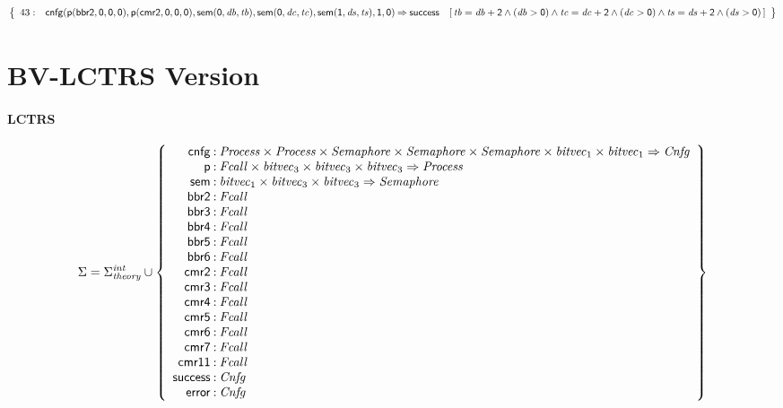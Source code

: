 \documentclass[a4paper]{article}
\newcommand{\Sort}[1]{\mathit{#1}}
\newcommand{\symb}[1]{\mathsf{#1}}
\newcommand{\var}[1]{\mathit{#1}}
\newcommand{\Constraint}[1]{[\, #1 \,]}
\newcommand{\Sigmainttheory}{\Sigma^{\mathit{int}}_{\mathit{theory}}}
\begin{document}
\begin{landscape}
\[
\left\{
\begin{array}{rr@{\>}c@{\>}ll}
\mathrm{43} : 
 & \symb{cnfg}(\symb{p}(\symb{bbr2},\symb{0},\symb{0},\symb{0}),\symb{p}(\symb{cmr2},\symb{0},\symb{0},\symb{0}),\symb{sem}(\symb{0},\var{db},\var{tb}),\symb{sem}(\symb{0},\var{dc},\var{tc}),\symb{sem}(\symb{1},\var{ds},\var{ts}),\symb{1},\symb{0})
 & \Rightarrow 
 & \symb{success}
 & \Constraint{\var{tb} = \var{db} + \symb{2} \land (\var{db} > \symb{0}) \land \var{tc} = \var{dc} + \symb{2} \land (\var{dc} > \symb{0}) \land \var{ts} = \var{ds} + \symb{2} \land (\var{ds} > \symb{0})} \\

\end{array}
\right\}
\]


\newpage
\section*{BV-LCTRS Version}


\paragraph{LCTRS}

\[
\Sigma = 
\Sigmainttheory \cup\left\{
\begin{array}{r@{\>}c@{\>}l}
\symb{cnfg} & : & \Sort{Process} \times \Sort{Process} \times \Sort{Semaphore} \times \Sort{Semaphore} \times \Sort{Semaphore} \times \Sort{bitvec}_{1} \times \Sort{bitvec}_{1} \Rightarrow \Sort{Cnfg}\\
\symb{p} & : & \Sort{Fcall} \times \Sort{bitvec}_{3} \times \Sort{bitvec}_{3} \times \Sort{bitvec}_{3} \Rightarrow \Sort{Process}\\
\symb{sem} & : & \Sort{bitvec}_{1} \times \Sort{bitvec}_{3} \times \Sort{bitvec}_{3} \Rightarrow \Sort{Semaphore}\\
\symb{bbr2} & : & \Sort{Fcall}\\
\symb{bbr3} & : & \Sort{Fcall}\\
\symb{bbr4} & : & \Sort{Fcall}\\
\symb{bbr5} & : & \Sort{Fcall}\\
\symb{bbr6} & : & \Sort{Fcall}\\
\symb{cmr2} & : & \Sort{Fcall}\\
\symb{cmr3} & : & \Sort{Fcall}\\
\symb{cmr4} & : & \Sort{Fcall}\\
\symb{cmr5} & : & \Sort{Fcall}\\
\symb{cmr6} & : & \Sort{Fcall}\\
\symb{cmr7} & : & \Sort{Fcall}\\
\symb{cmr11} & : & \Sort{Fcall}\\
\symb{success} & : & \Sort{Cnfg}\\
\symb{error} & : & \Sort{Cnfg}\\
\end{array}
\right\}
\]


\end{landscape}
\end{document}
